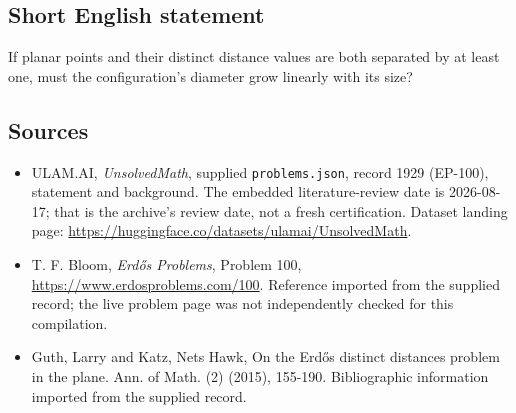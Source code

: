 \documentclass[11pt,a4paper]{article}
\begin{document}
\subsection{Short English statement}

If planar points and their distinct distance values are both separated by at least one, must the configuration's diameter grow linearly with its size?

\subsection{Sources}

{\small

\begin{itemize}

\item[\hypertarget{source:1929:1}{S1}] ULAM.AI, \emph{UnsolvedMath}, supplied \texttt{problems.json}, record 1929 (EP-100), statement and background. The embedded literature-review date is 2026-08-17; that is the archive’s review date, not a fresh certification. Dataset landing page: \url{https://huggingface.co/datasets/ulamai/UnsolvedMath}.

\item[\hypertarget{source:1929:2}{S2}] T. F. Bloom, \emph{Erdős Problems}, Problem 100, \url{https://www.erdosproblems.com/100}. Reference imported from the supplied record; the live problem page was not independently checked for this compilation.

\item[\hypertarget{source:1929:3}{S3}] Guth, Larry and Katz, Nets Hawk, On the Erd\H{o}s distinct distances problem in the plane. Ann. of Math. (2) (2015), 155-190. Bibliographic information imported from the supplied record.

\end{itemize}

}

\label{end:1929}
\end{document}
